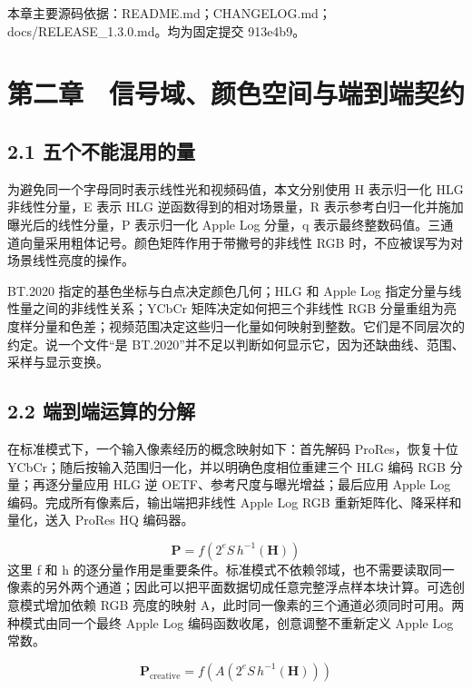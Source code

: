 \documentclass[UTF8,zihao=-4,openany]{ctexbook}
\begin{document}
\par\small 本章主要源码依据：README.md；CHANGELOG.md；docs/RELEASE\_1.3.0.md。均为固定提交 913e4b9。\normalsize

\chapter*{第二章　信号域、颜色空间与端到端契约}

\section*{2.1 五个不能混用的量}
为避免同一个字母同时表示线性光和视频码值，本文分别使用 H 表示归一化 HLG 非线性分量，E 表示 HLG 逆函数得到的相对场景量，R 表示参考白归一化并施加曝光后的线性分量，P 表示归一化 Apple Log 分量，q 表示最终整数码值。三通道向量采用粗体记号。颜色矩阵作用于带撇号的非线性 RGB 时，不应被误写为对场景线性亮度的操作。

BT.2020 指定的基色坐标与白点决定颜色几何；HLG 和 Apple Log 指定分量与线性量之间的非线性关系；YCbCr 矩阵决定如何把三个非线性 RGB 分量重组为亮度样分量和色差；视频范围决定这些归一化量如何映射到整数。它们是不同层次的约定。说一个文件“是 BT.2020”并不足以判断如何显示它，因为还缺曲线、范围、采样与显示变换。


\section*{2.2 端到端运算的分解}
在标准模式下，一个输入像素经历的概念映射如下：首先解码 ProRes，恢复十位 YCbCr；随后按输入范围归一化，并以明确色度相位重建三个 HLG 编码 RGB 分量；再逐分量应用 HLG 逆 OETF、参考尺度与曝光增益；最后应用 Apple Log 编码。完成所有像素后，输出端把非线性 Apple Log RGB 重新矩阵化、降采样和量化，送入 ProRes HQ 编码器。


\begin{equation}
\mathbf{P}=f\!\left(2^{e}S\,h^{-1}(\mathbf{H})\right)
\end{equation}
这里 f 和 h 的逐分量作用是重要条件。标准模式不依赖邻域，也不需要读取同一像素的另外两个通道；因此可以把平面数据切成任意完整浮点样本块计算。可选创意模式增加依赖 RGB 亮度的映射 A，此时同一像素的三个通道必须同时可用。两种模式由同一个最终 Apple Log 编码函数收尾，创意调整不重新定义 Apple Log 常数。


\begin{equation}
\mathbf{P}_{\mathrm{creative}}=f\!\left(A\left(2^{e}S\,h^{-1}(\mathbf{H})\right)\right)
\end{equation}
\end{document}
